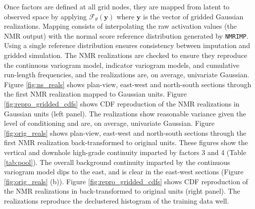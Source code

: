 Once factors are defined at all grid nodes, they are mapped from latent to observed space by applying $\mathcal{F}_{\theta}(\mathbf{y})$ where $\mathbf{y}$ is the vector of gridded Gaussian realizations. Mapping consists of interpolating the raw activation values (the \gls{NMR} output) with the normal score reference distribution generated by \texttt{NMRIMP}. Using a single reference distribution ensures consistency between imputation and gridded simulation. The \gls{NMR} realizations are checked to ensure they reproduce the continuous variogram model, indicator variogram models, and cumulative run-length frequencies, and the realizations are, on average, univariate Gaussian. Figure \ref{fig:ns_reals} shows plan-view, east-west and north-south sections through the first \gls{NMR} realization mapped to Gaussian units. Figure \ref{fig:repro_gridded_cdfs} shows \gls{CDF} reproduction of the \gls{NMR} realizations in Gaussian units (left panel). The realizations show reasonable variance given the level of conditioning and are, on average, univariate Gaussian. Figure \ref{fig:orig_reals} shows plan-view, east-west and north-south sections through the first \gls{NMR} realization back-transformed to original units. These figures show the vertical and downhole high-grade continuity imparted by factors 3 and 4 (Table \ref{tab:pool}). The overall background continuity imparted by the continuous variogram model dips to the east, and is clear in the east-west sections (Figure \ref{fig:orig_reals} (b)). Figure \ref{fig:repro_gridded_cdfs} shows \gls{CDF} reproduction of the \gls{NMR} realizations in back-transformed to original units (right panel). The realizations reproduce the declustered histogram of the training data well.


